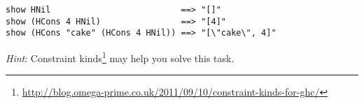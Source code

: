 \begin{verbatim}
show HNil                          ==> "[]"
show (HCons 4 HNil)                ==> "[4]"
show (HCons "cake" (HCons 4 HNil)) ==> "[\"cake\", 4]"
\end{verbatim}
\emph{Hint}: Constraint kinds\footnote{\url{http://blog.omega-prime.co.uk/2011/09/10/constraint-kinds-for-ghc/}} may help you solve this task.
